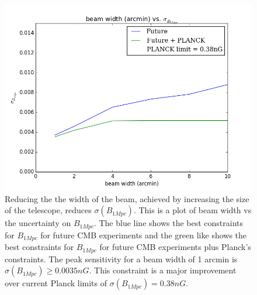 \begin{figure}[h]
\centering
\includegraphics[scale=0.7]{images/width.png}
\caption{Reducing the the width of the beam, achieved by increasing the size of the telescope, reduces $\sigma(B_{1Mpc})$. This is a plot of beam width vs the uncertainty on $B_{1Mpc}$. The blue line shows the best constraints for $B_{1Mpc}$ for future CMB experiments and the green like shows the best constraints for $B_{1Mpc}$ for future CMB experiments plus Planck's constraints. The peak sensitivity for a beam width of 1 arcmin is $\sigma(B_{1Mpc}) \geq 0.0035nG$. This constraint is a major improvement over current Planck limits of $\sigma(B_{1Mpc}) = 0.38nG$.}
\label{fig:width}
\end{figure}

